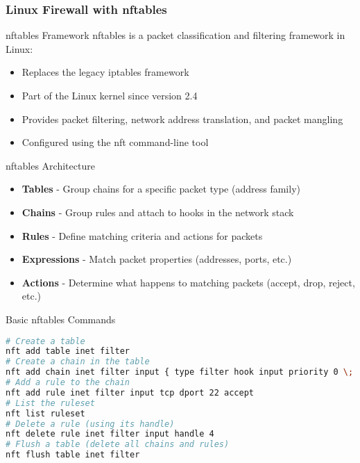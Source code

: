 \multend

\subsubsection{Linux Firewall with nftables}

\begin{definition}{nftables Framework}
nftables is a packet classification and filtering framework in Linux:
\begin{itemize}
    \item Replaces the legacy iptables framework
    \item Part of the Linux kernel since version 2.4
    \item Provides packet filtering, network address translation, and packet mangling
    \item Configured using the nft command-line tool
\end{itemize}
\end{definition}

\begin{concept}{nftables Architecture}
\begin{itemize}
    \item \textbf{Tables} - Group chains for a specific packet type (address family)
    \item \textbf{Chains} - Group rules and attach to hooks in the network stack
    \item \textbf{Rules} - Define matching criteria and actions for packets
    \item \textbf{Expressions} - Match packet properties (addresses, ports, etc.)
    \item \textbf{Actions} - Determine what happens to matching packets (accept, drop, reject, etc.)
\end{itemize}
\end{concept}

\begin{code}{Basic nftables Commands}
\begin{lstlisting}[language=bash, style=basesmolll]
# Create a table
nft add table inet filter
# Create a chain in the table
nft add chain inet filter input { type filter hook input priority 0 \; policy drop \; }
# Add a rule to the chain
nft add rule inet filter input tcp dport 22 accept
# List the ruleset
nft list ruleset
# Delete a rule (using its handle)
nft delete rule inet filter input handle 4
# Flush a table (delete all chains and rules)
nft flush table inet filter
\end{lstlisting}
\end{code}






